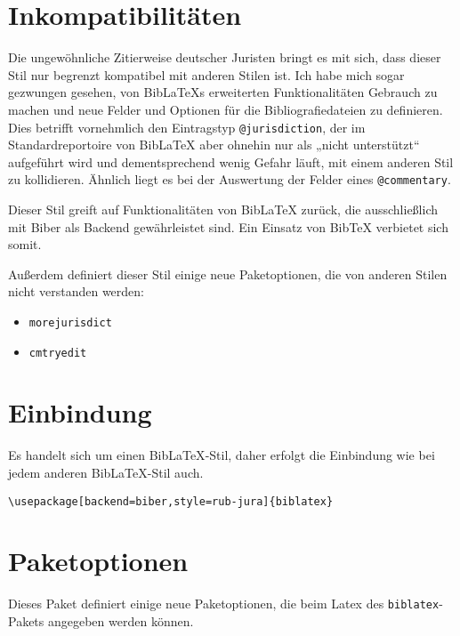 \documentclass[11pt,a4paper,DIV=calc]{scrartcl}
\newcommand\software[1]{\textsf{#1}}
\newcommand\Biblatex{\software{Bib\LaTeX{}}\xspace}
\begin{document}
\section{Inkompatibilitäten}\label{sec:inkompat}

Die ungewöhnliche Zitierweise deutscher Juristen bringt es mit sich,
dass dieser Stil nur begrenzt kompatibel mit anderen Stilen ist. Ich
habe mich sogar gezwungen gesehen, von \Biblatex{}s erweiterten
Funktionalitäten Gebrauch zu machen und neue Felder und Optionen für
die Bibliografiedateien zu definieren. Dies betrifft vornehmlich den
Eintragstyp \verb+@jurisdiction+, der im Standardreportoire von
\Biblatex aber ohnehin nur als „nicht unterstützt“ aufgeführt wird und
dementsprechend wenig Gefahr läuft, mit einem anderen Stil zu
kollidieren. Ähnlich liegt es bei der Auswertung der Felder eines
\verb+@commentary+.

Dieser Stil greift auf Funktionalitäten von \Biblatex zurück, die
ausschließlich mit \software{Biber} als Backend gewährleistet
sind. Ein Einsatz von \software{Bib\TeX{}} verbietet sich somit.

Außerdem definiert dieser Stil einige neue Paketoptionen, die von
anderen Stilen nicht verstanden werden:

\begin{itemize}
\item \verb+morejurisdict+
\item \verb+cmtryedit+
\end{itemize}

\section{Einbindung}

Es handelt sich um einen \Biblatex-Stil, daher erfolgt die Einbindung
wie bei jedem anderen \Biblatex-Stil auch.

\begin{verbatim}
\usepackage[backend=biber,style=rub-jura]{biblatex}
\end{verbatim}

\section{Paketoptionen}

Dieses Paket definiert einige neue Paketoptionen, die beim Latex des
\verb+biblatex+-Pakets angegeben werden können.
\end{document}
